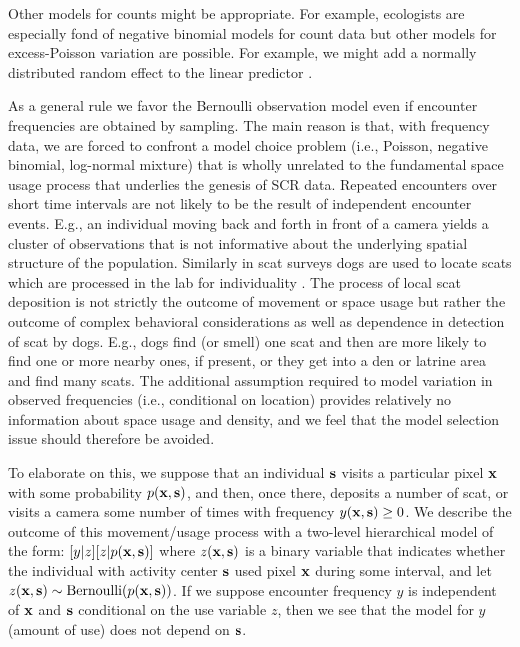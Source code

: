 Other models for counts might be appropriate. For example, ecologists
are especially fond of negative binomial models for count data
\citep{verhoef_boveng:2007,white_bennetts:1996,kery_etal:2005}
but other models for excess-Poisson variation are possible. For
example, we might add a normally distributed random effect to
the linear predictor \citep{coull_agresti:1999}.

As a general rule we favor the Bernoulli observation model even if
encounter frequencies are obtained by sampling.  The main reason is
that, with frequency data, we are forced to confront a model choice
problem (i.e., Poisson, negative binomial, log-normal mixture) that is
wholly unrelated to the fundamental space usage process that underlies
the genesis of SCR data. Repeated encounters over short time intervals
are not likely to be the result of independent encounter events. E.g.,
an individual moving back and forth in front of a camera yields a
cluster of observations that is not informative about the underlying
spatial structure of the population. Similarly in scat surveys dogs
are used to locate scats which are processed in the lab for
individuality \citep{kohn_etal:1999, mackay_etal:2008,
  thompson_etal:2012}.  The process of local scat deposition is not
strictly the outcome of movement or space usage but rather the outcome
of complex behavioral considerations as well as dependence in
detection of scat by dogs. E.g., dogs find (or smell) one scat and
then are more likely to find one or more nearby ones, if present, or
they get into a den or latrine area and find many scats.  The
additional assumption required to model variation in observed
frequencies (i.e., conditional on location) provides relatively no
information about space usage and density, and we feel that the model
selection issue should therefore be avoided.

To elaborate on this, we suppose that an individual ${\bf s}$ visits a
particular pixel ${\bf x}$ with some probability $p({\bf x}, {\bf
  s})$, and then, once there, deposits a number of scat, or visits
a camera some number of times with frequency $y({\bf x},{\bf s}) \ge
0$.  We describe the outcome of this movement/usage process with a two-level
hierarchical model of the form: $[y|z][z|p({\bf x},{\bf s})]$ where 
$z({\bf x},{\bf s})$ is a binary variable that indicates whether the
individual with activity center ${\bf s}$ used pixel ${\bf x}$
during some interval, and let $z({\bf x},{\bf s}) \sim
\mbox{Bernoulli}(p({\bf x},{\bf s}))$. If we suppose  encounter frequency
$y$ is independent of ${\bf x}$ and ${\bf s}$ conditional on the
use variable  $z$, then  we see that 
the model for $y$ (amount of use) does not depend on ${\bf s}$. 



